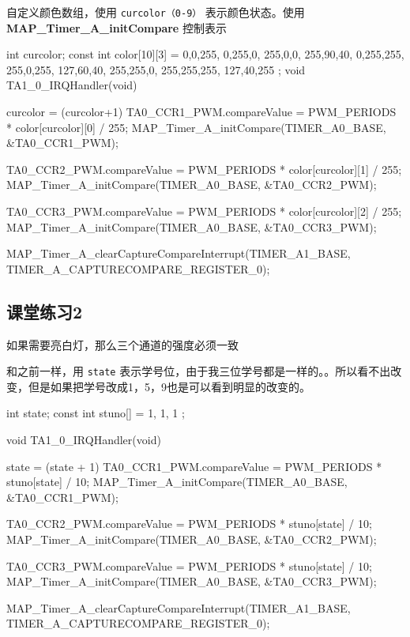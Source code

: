 \documentclass[a4paper,10pt,UTF8]{paper}
\numberwithin{equation}{section}
\numberwithin{figure}{section}
\begin{document}
自定义颜色数组，使用 \texttt{curcolor（0-9）} 表示颜色状态。使用 \textbf{MAP\_Timer\_A\_initCompare} 控制表示

\begin{ccode}
  int curcolor;
  const int color[10][3] = {
    {0,0,255},
    {0,255,0},
    {255,0,0},
    {255,90,40},
    {0,255,255},
    {255,0,255},
    {127,60,40},
    {255,255,0},
    {255,255,255},
    {127,40,255}
  };
  void TA1_0_IRQHandler(void)
  {
    curcolor = (curcolor+1) %
    TA0_CCR1_PWM.compareValue = PWM_PERIODS * color[curcolor][0] / 255;
    MAP_Timer_A_initCompare(TIMER_A0_BASE, &TA0_CCR1_PWM); 

    TA0_CCR2_PWM.compareValue = PWM_PERIODS * color[curcolor][1] / 255;
    MAP_Timer_A_initCompare(TIMER_A0_BASE, &TA0_CCR2_PWM); 

    TA0_CCR3_PWM.compareValue = PWM_PERIODS * color[curcolor][2] / 255;
    MAP_Timer_A_initCompare(TIMER_A0_BASE, &TA0_CCR3_PWM); 

    MAP_Timer_A_clearCaptureCompareInterrupt(TIMER_A1_BASE, 
    TIMER_A_CAPTURECOMPARE_REGISTER_0);
  }
\end{ccode}

\subsection{课堂练习2}

如果需要亮白灯，那么三个通道的强度必须一致

和之前一样，用 \texttt{state} 表示学号位，由于我三位学号都是一样的。。所以看不出改变，但是如果把学号改成1，5，9也是可以看到明显的改变的。

\begin{ccode}
  int state;
  const int stuno[] = {
      1, 1, 1
  };

  void TA1_0_IRQHandler(void)
  {
    state = (state + 1) %
    TA0_CCR1_PWM.compareValue = PWM_PERIODS * stuno[state] / 10;
    MAP_Timer_A_initCompare(TIMER_A0_BASE, &TA0_CCR1_PWM); 

    TA0_CCR2_PWM.compareValue = PWM_PERIODS * stuno[state] / 10;
    MAP_Timer_A_initCompare(TIMER_A0_BASE, &TA0_CCR2_PWM); 

    TA0_CCR3_PWM.compareValue = PWM_PERIODS * stuno[state] / 10;
    MAP_Timer_A_initCompare(TIMER_A0_BASE, &TA0_CCR3_PWM); 

    MAP_Timer_A_clearCaptureCompareInterrupt(TIMER_A1_BASE, 
    TIMER_A_CAPTURECOMPARE_REGISTER_0); 
  }
\end{ccode}
\end{document}
